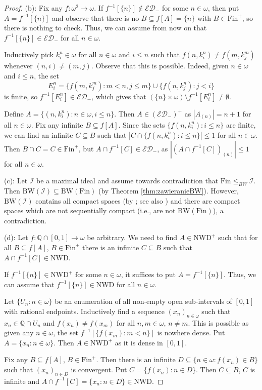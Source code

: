 \documentclass{amsart}
\theoremstyle{plain}
\theoremstyle{definition}
\theoremstyle{remark}
\newcommand{\cI}{\mathcal{I}}
\newcommand{\I}{\cI}
\newcommand{\Fin}{\mathrm{Fin}}
\newcommand{\ED}{\mathcal{ED}}
\newcommand{\nwd}{\mathrm{NWD}}
\newcommand{\BW}{\mathrm{BW}}
\begin{document}
\begin{proof}
 

\medskip

(b): Fix any $f:\omega^2\to\omega$. If $f^{-1}[\{n\}]\notin\ED_-$ for some $n\in\omega$, then put $A=f^{-1}[\{n\}]$ and observe that there is no $B\subseteq f[A]=\{n\}$ with $B\in\Fin^+$, so there is nothing to check. Thus, we can assume from now on that $f^{-1}[\{n\}]\in\ED_-$ for all $n\in\omega$. 

Inductively pick $k^n_i\in\omega$ for all $n\in\omega$ and $i\leq n$ such that $f(n,k^n_i)\neq f(m,k^m_j)$ whenever $(n,i)\neq(m,j)$. Observe that this is possible. Indeed, given $n\in\omega$ and $i\leq n$, the set 
\[
E^n_i=\{f(m,k^m_j): m<n,j\leq m\}\cup\{f(n,k^n_j): j<i\}
\]
is finite, so $f^{-1}[E^n_i]\in\ED_-$, which gives that $(\{n\}\times\omega)\setminus f^{-1}[E^n_i]\neq\emptyset$. 

Define $A=\{(n,k^n_i): n\in\omega,i\leq n\}$. Then $A\in(\ED_-)^+$ as $|A_{(n)}|=n+1$ for all $n\in\omega$. Fix any infinite $B\subseteq f[A]$. Since the sets $\{f(n,k^n_i):i\leq n\}$ are finite, we can find an infinite $C\subseteq B$ such that $|C\cap \{f(n,k^n_i):i\leq n\}|\leq 1$ for all $n\in\omega$. Then $B\cap C=C\in\Fin^+$, but $A\cap f^{-1}[C]\in\ED_-$, as $|(A\cap f^{-1}[C])_{(n)}|\leq 1$ for all $n\in\omega$. 

\medskip

(c): Let $\I$ be a maximal ideal and assume towards contradiction that $\Fin\leq_{BW}\I$. Then $\BW(\I)\subseteq\BW(\Fin)$ (by Theorem \ref{thm:zawieranieBW}). However, $\BW(\I)$ contains all compact spaces (by \cite[Theorems 3.1 and 3.3]{MR251697}; see also \cite[Theorem 1.2]{FT}) and there are compact spaces which are not sequentially compact (i.e., are not $\BW(\Fin)$), a contradiction. 

(d): Let $f:\mathbb{Q}\cap[0,1]\to\omega$ be arbitrary. We need to find $A\in\nwd^+$ such that for all $B\subseteq f[A]$, $B\in\Fin^+$ there is an infinite $C\subseteq B$ such that $A\cap f^{-1}[C]\in\nwd$. 

If $f^{-1}[\{n\}]\in\nwd^+$ for some $n\in\omega$, it suffices to put $A=f^{-1}[\{n\}]$. Thus, we can assume that $f^{-1}[\{n\}]\in\nwd$ for all $n\in\omega$.

Let $\{U_n:n\in\omega\}$ be an enumeration of all non-empty open sub-intervals of $[0,1]$ with rational endpoints. Inductively find a sequence $(x_n)_{n\in\omega}$ such that $x_n\in\mathbb{Q}\cap U_n$ and $f(x_n)\neq f(x_m)$ for all $n,m\in\omega$, $n\neq m$. This is possible as given any $n\in\omega$, the set $f^{-1}[\{f(x_m):m<n\}]$
is nowhere dense. Put $A=\{x_n:n\in\omega\}$. Then $A\in\nwd^+$ as it is dense in $[0,1]$.

Fix any $B\subseteq f[A]$, $B\in\Fin^+$. Then there is an infinite $D\subseteq \{n\in\omega: f(x_n)\in B\}$ such that $(x_n)_{n\in D}$ is convergent. Put $C=\{f(x_n):n\in D\}$. Then $C\subseteq B$, $C$ is infinite and $A\cap f^{-1}[C]=\{x_n:n\in D\}\in\nwd$.
\end{proof}
\end{document}
